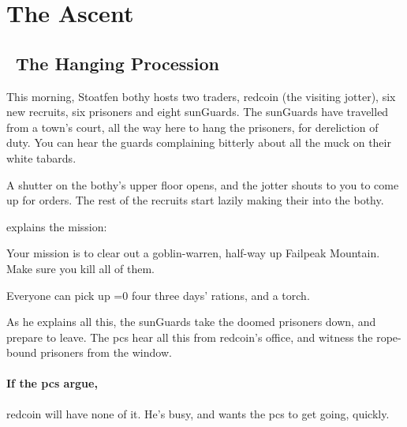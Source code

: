 \section{The Ascent}


\begin{multicols}{2}

\subsection[The Hanging Procession]{~The Hanging Procession~}

\begin{boxtext}
  This morning, Stoatfen \gls{bothy} hosts two traders, \gls{redcoin} (the visiting \gls{jotter}), six new recruits, six prisoners and eight \glspl{sunGuard}.
  The \glspl{sunGuard} have travelled from a town's \gls{court}, all the way here to hang the prisoners, for dereliction of duty.
  You can hear the guards complaining bitterly about all the muck on their white tabards.

  A shutter on the \gls{bothy}'s upper floor opens, and the \gls{jotter} shouts to you to come up for orders.
  The rest of the recruits start lazily making their into the \gls{bothy}.
\end{boxtext}

 explains the mission:

\begin{exampletext}
  Your mission is to clear out a goblin-warren, half-way up Failpeak Mountain.
  Make sure you kill all of them.

  Everyone can pick up \ifnum\value{temperature}=0 four \else three \fi days' rations, and a torch.
\end{exampletext}

\noindent
As he explains all this, the \glspl{sunGuard} take the doomed prisoners down, and prepare to leave.
The \glspl{pc} hear all this from \gls{redcoin}'s office, and witness the rope-bound prisoners from the window.


\paragraph{If the \glspl{pc} argue,}
\gls{redcoin} will have none of it.
He's busy, and wants the \glspl{pc} to get going, quickly.


\end{multicols}
